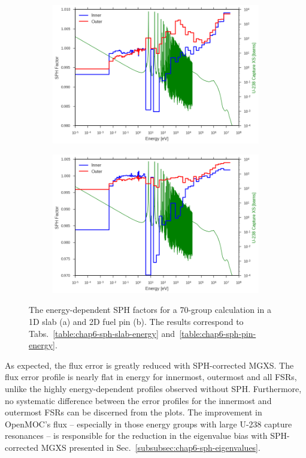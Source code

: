 \begin{figure}[h!]
\begin{subfigure}{.9\textwidth}
  \centering
  \includegraphics[width=\linewidth]{figures/sph/slab/sph-inner-outer}
  \caption{}
\end{subfigure}
\begin{subfigure}{.9\textwidth}
  \centering
  \includegraphics[width=\linewidth]{figures/sph/pin-cell/sph-inner-outer}
  \caption{}
\end{subfigure}
\caption[SPH factors by energy group]{The energy-dependent \ac{SPH} factors for a 70-group calculation in a 1D slab (a) and 2D fuel pin (b). The results correspond to Tabs.~\ref{table:chap6-sph-slab-energy} and~\ref{table:chap6-sph-pin-energy}.}
\label{fig:chap6-sph-energy}
\end{figure}

As expected, the flux error is greatly reduced with \ac{SPH}-corrected \ac{MGXS}. The flux error profile is nearly flat in energy for innermost, outermost and all \ac{FSR}s, unlike the highly energy-dependent profiles observed without \ac{SPH}. Furthermore, no systematic difference between the error profiles for the innermost and outermost \ac{FSR}s can be discerned from the plots. The improvement in OpenMOC's flux -- especially in those energy groups with large U-238 capture resonances -- is responsible for the reduction in the eigenvalue bias with \ac{SPH}-corrected \ac{MGXS} presented in Sec.~\ref{subsubsec:chap6-sph-eigenvalues}.

